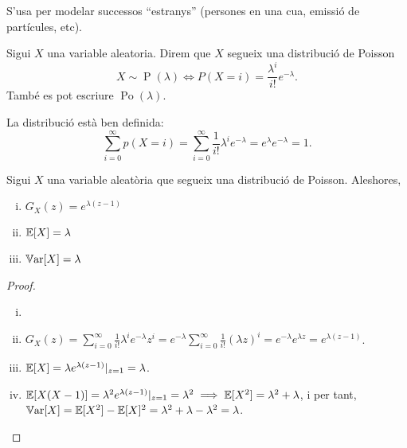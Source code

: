 S'usa per modelar successos ``estranys'' (persones en una cua, emissió de partícules, etc).

\begin{defi}
    Sigui $X$ una variable aleatoria. Direm que $X$ segueix una distribució de Poisson
    \[X \sim \operatorname{P}(\lambda) \iff P(X=i) = \frac{\lambda^i }{i!}e^{-\lambda}.\]
    També es pot escriure $\operatorname{Po}(\lambda)$.
\end{defi}

\begin{obs}
    La distribució està ben definida:
    \[\sum_{i=0}^\infty p(X=i) = \sum_{i=0}^\infty \frac{1}{i!}\lambda^i e^{-\lambda} = e^\lambda e^{-\lambda} = 1.\]
\end{obs}

\begin{prop}
    Sigui $X$ una variable aleatòria que segueix una distribució de Poisson. Aleshores,
    \begin{enumerate}[i)]
        \item $G_X(z) = e^{\lambda(z-1)}$
        \item $\operatorname{\mathbb{E}}[X] = \lambda$
        \item $\operatorname{\mathbb{V}ar}[X] = \lambda$
    \end{enumerate}
\end{prop}

\begin{proof}
    \begin{enumerate}[i)]
        \item[]
        \item $G_X(z) = \sum\limits_{i=0}^\infty \frac{1}{i!}\lambda^i e^{-\lambda} z^i =
            e^{-\lambda} \sum\limits_{i=0}^\infty \frac{1}{i!}(\lambda z)^i = e^{-\lambda}e^{\lambda z} = e^{\lambda(z-1)}$.
        \item $\operatorname{\mathbb{E}}[X] = \lambda e^{\lambda(z-1)}|_{z=1} = \lambda$.
        \item $\operatorname{\mathbb{E}}[X(X-1)] = \lambda^2 e^{\lambda(z-1)}|_{z=1} = \lambda^2 \implies \operatorname{\mathbb{E}}[X^2] = \lambda^2+\lambda$,  i per tant, 
         $\operatorname{\mathbb{V}ar}[X] = \operatorname{\mathbb{E}}[X^2] - \operatorname{\mathbb{E}}[X]^2 = \lambda^2 + \lambda - \lambda^2 = \lambda$.
    \end{enumerate}
\end{proof}

